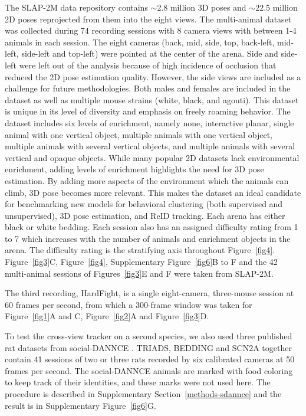 \documentclass[pdflatex, sn-nature]{sn-jnl}
\theoremstyle{thmstyleone}%
\theoremstyle{thmstyletwo}%
\theoremstyle{thmstylethree}%
\begin{document}
The SLAP-2M data repository contains $\sim$2.8 million 3D poses and $\sim$22.5 million 2D poses reprojected from them into the eight views. The multi-animal dataset was collected during 74 recording sessions with 8 camera views with between 1-4 animals in each session. The eight cameras (back, mid, side, top, back-left, mid-left, side-left and top-left) were pointed at the center of the arena. Side and side-left were left out of the analysis because of high incidence of occlusion that reduced the 2D pose estimation quality. However, the side views are included as a challenge for future methodologies. Both males and females are included in the dataset as well as multiple mouse strains (white, black, and agouti). This dataset is unique in its level of diversity and emphasis on freely roaming behavior. The dataset includes six levels of enrichment, namely none, interactive planar, single animal with one vertical object, multiple animals with one vertical object, multiple animals with several vertical objects, and multiple animals with several vertical and opaque objects. While many popular 2D datasets lack environmental enrichment, adding levels of enrichment highlights the need for 3D pose estimation. By adding more aspects of the environment which the animals can climb, 3D pose becomes more relevant. This makes the dataset an ideal candidate for benchmarking new models for behavioral clustering (both supervised and unsupervised), 3D pose estimation, and ReID tracking. Each arena has either black or white bedding. Each session also has an assigned difficulty rating from 1 to 7 which increases with the number of animals and enrichment objects in the arena. The difficulty rating is the stratifying axis throughout Figure~\ref{fig4}. Figure~\ref{fig3}C, Figure~\ref{fig4}, Supplementary Figure~\ref{fig6}B to F and the 42 multi-animal sessions of Figures~\ref{fig3}E and F were taken from SLAP-2M. 

The third recording, HardFight, is a single eight-camera, three-mouse session at 60 frames per second, from which a 300-frame window was taken for Figure~\ref{fig1}A and C, Figure~\ref{fig2}A and Figure~\ref{fig3}D.

To test the cross-view tracker on a second species, we also used three published rat datasets from social-DANNCE \citep{Klibaite2025}. TRIADS, BEDDING and SCN2A together contain 41 sessions of two or three rats recorded by six calibrated cameras at 50 frames per second. The social-DANNCE animals are marked with food coloring to keep track of their identities, and these marks were not used here. The procedure is described in Supplementary Section~\ref{methods-sdannce} and the result is in Supplementary Figure~\ref{fig6}G.
\end{document}
